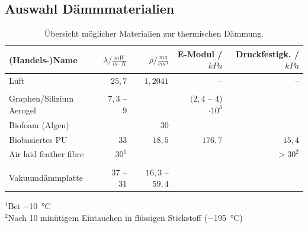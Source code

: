 		\subsection{Auswahl Dämmmaterialien}
			\begin{table}[H]
				\centering
				\caption{Übersicht möglicher Materialien zur thermischen Dämmung.}
				\begin{tabular}{@{}lrrrr@{}}
					\toprule
					(Handels-)Name																& \(\lambda / \frac{mW}{m \cdot K}\)	& \(\rho / \frac{mg}{cm^3}\)	& E-Modul / \(kPa\) 				& Druckfestigk. / \(kPa\) \\
					\midrule
					Luft 																		&\(25,7\)						&\(1,2041\)						&--									&-- \\
					&&&&\\
					Graphen/Silizium Aerogel \cite{silica.graphene.aerogel.Lei.2017} 			& \(7,3\) -- \(9\)			&								&\((2,4\) -- \(4\))\(\cdot 10^3\)	&\\
					Biofoam (Algen) \cite{Biofoam2.Morrison.1994}								&								&30								&									&\\
					Biobasiertes PU \cite{Biobased.PU.HuangX.QiJ.DeHoopC.XieJ.andChenY.2017}	&\(33\)							&\(18,5\)						&\(176,7\)							&\(15,4\)\\
					Air laid feather fibre \cite{air.laid.feather.fibre.Zhao.2020} 				& \(30^1\)		&								&									& \( > 30^2 \) \\
					&&&&\\
					Vakuumdämmplatte \cite{Vakuumplate.Nagarajan.2013}							&\(37\) -- \(31\)			&\(16,3\) -- \(59,4\)		&									&\\
					\bottomrule
				\end{tabular}
				\label{tab:isomaterial}
			\end{table}
			\( ^1 \)Bei \SI{-10}{\celsius}\\
			\( ^2 \)Nach 10 minütigem Eintauchen in flüssigen Stickstoff (\SI{-195}{\celsius})

